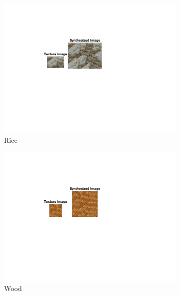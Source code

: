\documentclass[10pt,twocolumn,letterpaper]{article}
\begin{document}
\begin{figure}
\begin{subfigure}[h]{0.33\textwidth}
        \includegraphics[trim={4.5cm 7cm 8.0cm 3cm}, clip, scale=1.5, width=\textwidth]{../results/syn_final/result_rice_B_40.png}
        \caption{Rice}
        \label{fig:apple_res}
    \end{subfigure}
    \begin{subfigure}[h]{0.33\textwidth}
        \centering
        \includegraphics[trim={4.5cm 7cm 8.0cm 3cm}, clip, scale=1.5, width=\textwidth]{../results/syn_final/result_wood_c_B_40.png}
        \caption{Wood}
        \label{fig:apple_res}
    \end{subfigure}
    \hfill
    \begin{subfigure}[h]{0.33\textwidth}
       \centering

\end{subfigure}
\end{figure}
\end{document}
